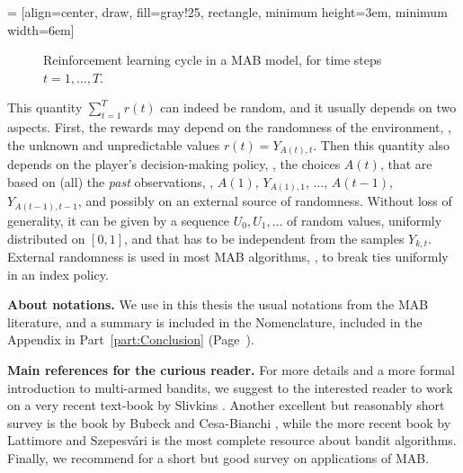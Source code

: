  = [align=center, draw, fill=gray!25, rectangle, minimum height=3em, minimum width=6em]
\begin{figure}[h!]
    \centering
\caption{Reinforcement learning cycle in a MAB model, for time steps $t=1,\dots,T$.}
\label{fig:2:ReinforcementLearningCycleMABmodel}
\end{figure}


\label{par:2:externalrandomness}
This quantity $\sum_{t=1}^T r(t)$ can indeed be random, and it usually depends on two aspects.
First, the rewards may depend on the randomness of the environment, \ie, the unknown and unpredictable values $r(t)=Y_{A(t),t}$.
Then this quantity also depends on the player's decision-making policy, \ie, the choices $A(t)$, that are based on (all) the \emph{past} observations, \ie, $A(1)$, $Y_{A(1),1}$, $\dots$, $A(t-1)$, $Y_{A(t-1),t-1}$, and possibly on an external source of randomness.
%
Without loss of generality, it can be given by a sequence $U_0,U_1,\dots$ of \iid{} random values, uniformly distributed on $[0,1]$, and that has to be independent from the samples $Y_{k,t}$.
External randomness is used in most MAB algorithms, \eg, to break ties uniformly in an index policy.


\textbf{About notations.}
%
We use in this thesis the usual notations from the MAB literature,
and a summary is included in the Nomenclature, included in the Appendix in Part~\ref{part:Conclusion} (Page~\pageref{chapter:nomenclature}).


\textbf{Main references for the curious reader.}
%
For more details and a more formal introduction to multi-armed bandits, we suggest to the interested reader to work on a very recent text-book by Slivkins \cite{Slivkins2019}.
Another excellent but reasonably short survey is the book by Bubeck and Cesa-Bianchi \cite{Bubeck12}, while the more recent book by Lattimore and Szepesv{\'a}ri \cite{LattimoreBanditAlgorithmsBook} is the most complete resource about bandit algorithms.
Finally, we recommend \cite{bouneffouf2019survey} for a short but good survey on applications of MAB.



